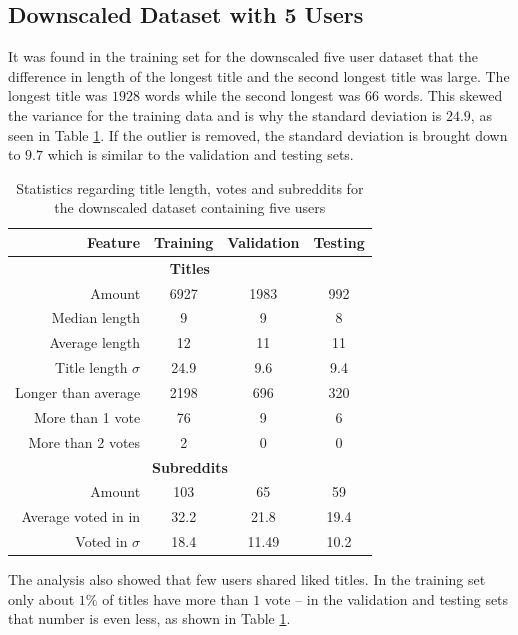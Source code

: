 \subsection{Downscaled Dataset with 5 Users}
\label{sec:five-user-data-set}
It was found in the training set for the downscaled five user dataset that the difference in length of the longest title and the second longest title was large. The longest title was $1928$ words while the second longest was $66$ words. This skewed the variance for the training data and is why the standard deviation is $24.9$, as seen in Table \ref{table:5_user_stats}. If the outlier is removed, the standard deviation is brought down to $9.7$ which is similar to the validation and testing sets.
\begin{table}[h!]
    \centering
    \begin{tabular}{ r | c | c | c }
    \textbf{Feature} & \textbf{Training} & \textbf{Validation} & \textbf{Testing} \\ \hline \hline
    \multicolumn{4}{c}{\textbf{Titles}} \\ \hline \hline
    Amount & 6927 & 1983 & 992 \\ \hline
    Median length & 9 & 9 & 8 \\ \hline
    Average length & 12 & 11 & 11  \\ \hline
    Title length $\sigma$ & 24.9 & 9.6 & 9.4 \\ \hline
    Longer than average & 2198 & 696 & 320 \\ \hline
    More than 1 vote & 76 & 9 & 6 \\ \hline
    More than 2 votes & 2 & 0 & 0\\ \hline \hline
    \multicolumn{4}{c}{\textbf{Subreddits}} \\ \hline \hline
    Amount & 103 & 65 & 59  \\ \hline
    Average voted in in & 32.2 & 21.8 & 19.4 \\ \hline
    Voted in $\sigma$ & 18.4 & 11.49 & 10.2  \\ \hline
    \end{tabular}
    \caption{Statistics regarding title length, votes and subreddits for the downscaled dataset containing five users}
    \label{table:5_user_stats}
\end{table}
The analysis also showed that few users shared liked titles. In the training set only about $1\%$ of titles have more than $1$ vote -- in the validation and testing sets that number is even less, as shown in Table \ref{table:5_user_stats}.
